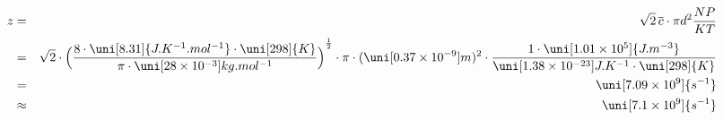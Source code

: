 \begin{eqnarray*}
z &=& 
\sqrt{2} \, \overline{c} \cdot \pi d^2 \frac{NP}{KT}
\\ &=& 
\sqrt{2} \cdot 
{
\Bigl(
\frac
{
8 \cdot \uni[8.31]{J.K^{-1}.mol^{-1}} \cdot \uni[298]{K}
}
{
\pi \cdot \uni[28 \times 10^{-3}]{kg.mol^{-1}}
}
\Bigr)
}
^{\frac{1}{2}}
\cdot 
\pi
\cdot 
(
\uni[0.37 \times 10^{-9}]{m}
)^{2}
\cdot 
\frac
{1 \cdot \uni[1.01 \times 10^5]{J.m^{-3}} }{\uni[1.38 \times 10^{-23}]{J.K^{-1}} \cdot \uni[298]{K}}
\\ &=&
\uni[7.09 \times 10^9]{s^{-1}}
\\ &\approx&
\uni[7.1 \times 10^9]{s^{-1}}
\label{}
\end{eqnarray*}

